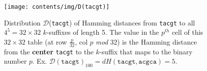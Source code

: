 \begin{figure}[h]
	\centering
	\label{fig:distribution}
	\texttt{[image: contents/img/D(tacgt)]}
	\caption{
		Distribution $\mathcal{D}$(\texttt{tacgt}) of Hamming distances from \texttt{tacgt} \cite{sia2015}
		to all $4^{5} = 32\times32$ $k$-suffixes of length 5.
		The value in the $p^{th}$ cell of this $32\times32$ table (at row $\frac{p}{32}$, col $p$ \emph{mod} 32) is the Hamming distance from the \textbf{center} \texttt{tacgt} to the $k$-suffix that maps to the binary number $p$.\newline
		Ex. $\mathcal{D}(\texttt{tacgt})_{100} = dH(\texttt{tacgt}, \texttt{acgca}) = 5$.\newline
	}
\end{figure} 